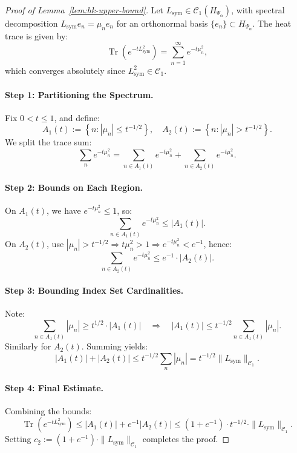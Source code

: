 \begin{proof}[Proof of Lemma~\ref{lem:hk-upper-bound}]
Let \( L_{\mathrm{sym}} \in \mathcal{C}_1(H_{\Psi_\alpha}) \), with spectral decomposition \( L_{\mathrm{sym}} e_n = \mu_n e_n \) for an orthonormal basis \( \{ e_n \} \subset H_{\Psi_\alpha} \). The heat trace is given by:
\[
\operatorname{Tr}(e^{-t L_{\mathrm{sym}}^2}) = \sum_{n=1}^\infty e^{-t \mu_n^2},
\]
which converges absolutely since \( L_{\mathrm{sym}}^2 \in \mathcal{C}_1 \).

\paragraph{Step 1: Partitioning the Spectrum.}
Fix \( 0 < t \le 1 \), and define:
\[
A_1(t) := \left\{ n : |\mu_n| \le t^{-1/2} \right\}, \quad
A_2(t) := \left\{ n : |\mu_n| > t^{-1/2} \right\}.
\]
We split the trace sum:
\[
\sum_n e^{-t \mu_n^2} = \sum_{n \in A_1(t)} e^{-t \mu_n^2} + \sum_{n \in A_2(t)} e^{-t \mu_n^2}.
\]

\paragraph{Step 2: Bounds on Each Region.}
On \( A_1(t) \), we have \( e^{-t \mu_n^2} \le 1 \), so:
\[
\sum_{n \in A_1(t)} e^{-t \mu_n^2} \le |A_1(t)|.
\]
On \( A_2(t) \), use \( |\mu_n| > t^{-1/2} \Rightarrow t \mu_n^2 > 1 \Rightarrow e^{-t \mu_n^2} < e^{-1} \), hence:
\[
\sum_{n \in A_2(t)} e^{-t \mu_n^2} \le e^{-1} \cdot |A_2(t)|.
\]

\paragraph{Step 3: Bounding Index Set Cardinalities.}
Note:
\[
\sum_{n \in A_1(t)} |\mu_n| \ge t^{1/2} \cdot |A_1(t)| \quad \Rightarrow \quad |A_1(t)| \le t^{-1/2} \sum_{n \in A_1(t)} |\mu_n|.
\]
Similarly for \( A_2(t) \). Summing yields:
\[
|A_1(t)| + |A_2(t)| \le t^{-1/2} \sum_n |\mu_n| = t^{-1/2} \|L_{\mathrm{sym}}\|_{\mathcal{C}_1}.
\]

\paragraph{Step 4: Final Estimate.}
Combining the bounds:
\[
\operatorname{Tr}(e^{-t L_{\mathrm{sym}}^2})
\le |A_1(t)| + e^{-1} |A_2(t)|
\le (1 + e^{-1}) \cdot t^{-1/2} \cdot \|L_{\mathrm{sym}}\|_{\mathcal{C}_1}.
\]
Setting \( c_2 := (1 + e^{-1}) \cdot \|L_{\mathrm{sym}}\|_{\mathcal{C}_1} \) completes the proof.
\end{proof}
